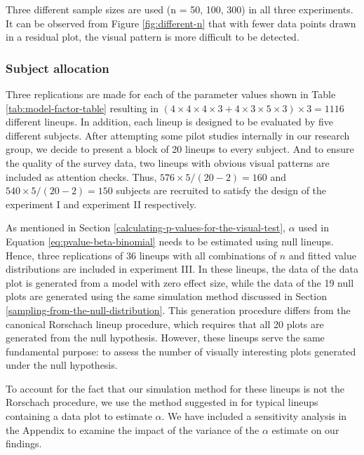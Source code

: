 \documentclass[]{interact}
\theoremstyle{plain}%
\theoremstyle{definition}
\theoremstyle{remark}
\begin{document}
Three different sample sizes are used (n = 50, 100, 300) in all three
experiments. It can be observed from Figure \ref{fig:different-n} that
with fewer data points drawn in a residual plot, the visual pattern is
more difficult to be detected.

\hypertarget{subject-allocation}{%
\subsubsection{Subject allocation}\label{subject-allocation}}

Three replications are made for each of the parameter values shown in
Table \ref{tab:model-factor-table} resulting in
\((4 \times 4 \times 4 \times 3 + 4 \times 3 \times 5 \times 3) \times 3 = 1116\)
different lineups. In addition, each lineup is designed to be evaluated
by five different subjects. After attempting some pilot studies
internally in our research group, we decide to present a block of 20
lineups to every subject. And to ensure the quality of the survey data,
two lineups with obvious visual patterns are included as attention
checks. Thus, \(576 \times 5 / (20-2) = 160\) and
\(540 \times 5 / (20-2) = 150\) subjects are recruited to satisfy the
design of the experiment I and experiment II respectively.

As mentioned in Section \ref{calculating-p-values-for-the-visual-test},
\(\alpha\) used in Equation \ref{eq:pvalue-beta-binomial} needs to be
estimated using null lineups. Hence, three replications of 36 lineups
with all combinations of \(n\) and fitted value distributions are
included in experiment III. In these lineups, the data of the data plot
is generated from a model with zero effect size, while the data of the
19 null plots are generated using the same simulation method discussed
in Section \ref{sampling-from-the-null-distribution}. This generation
procedure differs from the canonical Rorschach lineup procedure, which
requires that all 20 plots are generated from the null hypothesis.
However, these lineups serve the same fundamental purpose: to assess the
number of visually interesting plots generated under the null
hypothesis.

To account for the fact that our simulation method for these lineups is
not the Rorschach procedure, we use the method suggested in
\citet{vanderplas2021statistical} for typical lineups containing a data
plot to estimate \(\alpha\). We have included a sensitivity analysis in
the Appendix to examine the impact of the variance of the \(\alpha\)
estimate on our findings.
\end{document}

